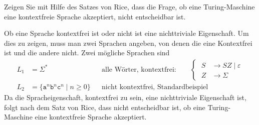 Zeigen Sie mit Hilfe des Satzes von Rice, dass die Frage, ob eine
Turing-Maschine eine kontextfreie Sprache akzeptiert, nicht entscheidbar
ist.

\begin{loesung}
Ob eine Sprache kontextfrei ist oder nicht ist eine nichttriviale
Eigenschaft.
Um dies zu zeigen, muss man zwei Sprachen angeben, von denen die eine
Kontextfrei ist und die andere nicht.
Zwei mögliche Sprachen sind
\begin{align*}
L_1
&=
\Sigma^*&&\text{alle Wörter, kontextfrei:}
\qquad
\left\{
\;
\begin{aligned}
S&\to SZ\mid \varepsilon\\
Z&\to \Sigma
\end{aligned}
\right.
\\
L_2
&=
\{\texttt{a}^n\texttt{b}^n\texttt{c}^n
\mid
n\ge 0
\}
&&\text{nicht kontextfrei, Standardbeispiel}
\end{align*}
Da die Spracheigenschaft, kontextfrei zu sein, eine nichttriviale
Eigenschaft ist, folgt nach dem Satz von Rice, dass nicht entscheidbar
ist, ob eine Turing-Maschine eine kontextfreie Sprache akzeptiert.
\end{loesung}
